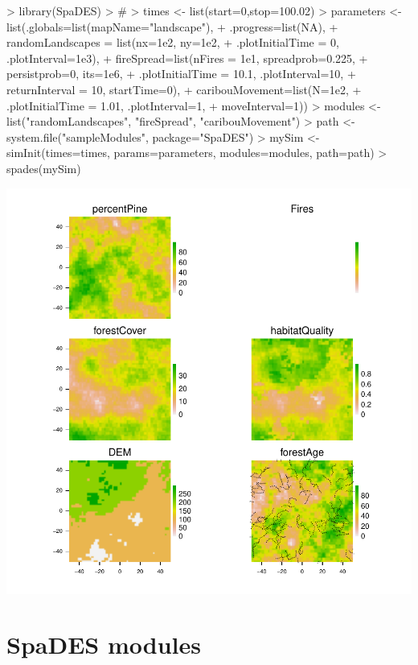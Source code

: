 \documentclass{article}
\begin{document}
\begin{Schunk}
\begin{Sinput}
> library(SpaDES)
> #
> times <- list(start=0,stop=100.02)
> parameters <- list(.globals=list(mapName="landscape"),
+                   .progress=list(NA),
+                   randomLandscapes = list(nx=1e2, ny=1e2,
+                                           .plotInitialTime = 0, .plotInterval=1e3),
+                   fireSpread=list(nFires = 1e1, spreadprob=0.225,
+                                   persistprob=0, its=1e6,
+                                   .plotInitialTime = 10.1, .plotInterval=10,
+                                   returnInterval = 10, startTime=0),
+                   caribouMovement=list(N=1e2,
+                                        .plotInitialTime = 1.01, .plotInterval=1,
+                                        moveInterval=1))
> modules <- list("randomLandscapes", "fireSpread", "caribouMovement")
> path <- system.file("sampleModules", package="SpaDES")
> mySim <- simInit(times=times, params=parameters, modules=modules, path=path)
> spades(mySim)
\end{Sinput}
\end{Schunk}
\includegraphics{introduction-using-SpaDES}

\newpage

\section{SpaDES modules}
\end{document}
